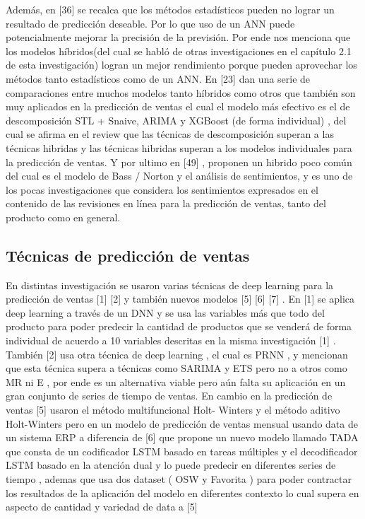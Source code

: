 \documentclass[conference]{IEEEtran}
\begin{document}
Además, en [36] se recalca que los métodos estadísticos pueden no lograr un
resultado de predicción deseable. Por lo que uso de un ANN puede potencialmente
mejorar la precisión de la previsión. Por ende nos menciona que los modelos
híbridos(del cual se habló de otras investigaciones en el capítulo 2.1 de esta
investigación) logran un mejor rendimiento porque pueden aprovechar los métodos
tanto estadísticos como de un ANN. En [23] dan una serie de comparaciones entre
muchos modelos tanto híbridos como otros que también son muy aplicados en la
predicción de ventas el cual el modelo más efectivo es el de descomposición STL +
Snaive, ARIMA y XGBoost (de forma individual) , del cual se afirma en el review que
las técnicas de descomposición superan a las técnicas hibridas y las técnicas
hibridas superan a los modelos individuales para la predicción de ventas.
Y por ultimo en [49] , proponen un hibrido poco común del cual es el modelo de Bass
/ Norton y el análisis de sentimientos, y es uno de los pocas investigaciones que
considera los sentimientos expresados en el contenido de las revisiones en línea
para la predicción de ventas, tanto del producto como en general.

\subsection{Técnicas de predicción de ventas}
En distintas investigación se usaron varias técnicas de deep learning para la
predicción de ventas [1] [2] y también nuevos modelos [5] [6] [7] .
En [1] se aplica deep learning a través de un DNN y se usa las variables más que
todo del producto para poder predecir la cantidad de productos que se venderá de
forma individual de acuerdo a 10 variables descritas en la misma investigación [1] .
También [2] usa otra técnica de deep learning , el cual es PRNN , y mencionan que
esta técnica supera a técnicas como SARIMA y ETS pero no a otros como MR ni E ,
por ende es un alternativa viable pero aún falta su aplicación en un gran conjunto de
series de tiempo de ventas.
En cambio en la predicción de ventas [5] usaron el método multifuncional Holt-
Winters y el método aditivo Holt-Winters pero en un modelo de predicción de ventas
mensual usando data de un sistema ERP a diferencia de [6] que propone un nuevo
modelo llamado TADA que consta de un codificador LSTM basado en tareas
múltiples y el decodificador LSTM basado en la atención dual y lo puede predecir en
diferentes series de tiempo , ademas que usa dos dataset ( OSW y Favorita ) para
poder contractar los resultados de la aplicación del modelo en diferentes contexto lo
cual supera en aspecto de cantidad y variedad de data a [5]
\end{document}
